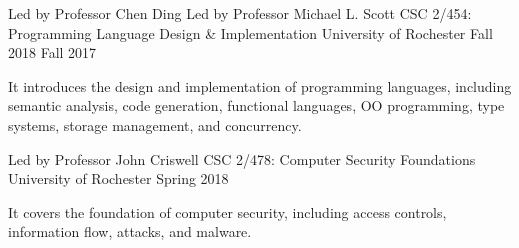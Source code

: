 

\begin{cventries}

  \cventryta
    {Led by Professor Chen Ding} %
    {Led by Professor Michael L. Scott} %
    {CSC 2/454: Programming Language Design \& Implementation} %
    {University of Rochester} %
    {Fall 2018} %
    {Fall 2017} %
    {
      \begin{cvitems} %
        \item {It introduces the design and implementation of programming languages, including semantic analysis, code generation, functional languages, OO programming, type systems, storage management, and concurrency.}
      \end{cvitems}
    }

  \cventry
    {Led by Professor John Criswell} %
    {CSC 2/478: Computer Security Foundations} %
    {University of Rochester} %
    {Spring 2018} %
    {
      \begin{cvitems} %
        \item {It covers the foundation of computer security, including access controls, information flow, attacks, and malware. }
      \end{cvitems}
    }
\end{cventries}
